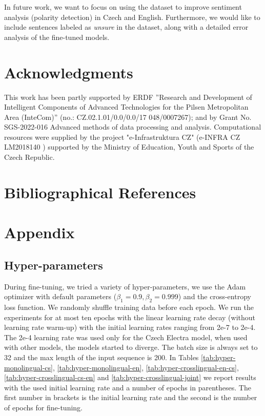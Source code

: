 \documentclass[10pt, a4paper]{article}
\begin{document}
\par In future work, we want to focus on using the dataset to improve sentiment analysis (polarity detection) in Czech and English. Furthermore, we would like to include sentences labeled as \textit{unsure} in the dataset, along with a detailed error analysis of the fine-tuned models.











\section{Acknowledgments}
This work has been partly supported by ERDF ”Research and Development of Intelligent Components of Advanced Technologies for the Pilsen Metropolitan Area (InteCom)” (no.: CZ.02.1.01/0.0/0.0/17 048/0007267); and by Grant No. SGS-2022-016 Advanced methods of data processing and analysis. Computational resources were supplied by the project "e-Infrastruktura CZ" (e-INFRA CZ LM2018140 ) supported by the Ministry of Education, Youth and Sports of the Czech Republic.




\section{Bibliographical References}\label{reference}









\appendix

\section{Appendix}
\subsection{Hyper-parameters}
\label{sec:transformer-appendix}
During fine-tuning, we tried a variety of hyper-parameters, we use the Adam \cite{Kingma-adam} optimizer with default parameters ($\beta_1 = 0.9, \beta_2 = 0.999$) and the cross-entropy loss function. We randomly shuffle training data before each epoch. We run the experiments for at most ten epochs with the linear learning rate decay (without learning rate warm-up) with the initial learning rates ranging from 2e-7 to 2e-4. The 2e-4 learning rate was used only for the Czech Electra model, when used with other models, the models started to diverge. The batch size is always set to 32 and the max length of the input sequence is 200. In Tables \ref{tab:hyper-monolingual-cs}, \ref{tab:hyper-monolingual-en}, \ref{tab:hyper-crosslingual-en-cs}, \ref{tab:hyper-crosslingual-cs-en} and \ref{tab:hyper-crosslingual-joint} we report results with the used initial learning rate and a number of epochs in parentheses. The first number in brackets is the initial learning rate and the second is the number of epochs for fine-tuning.
\end{document}
